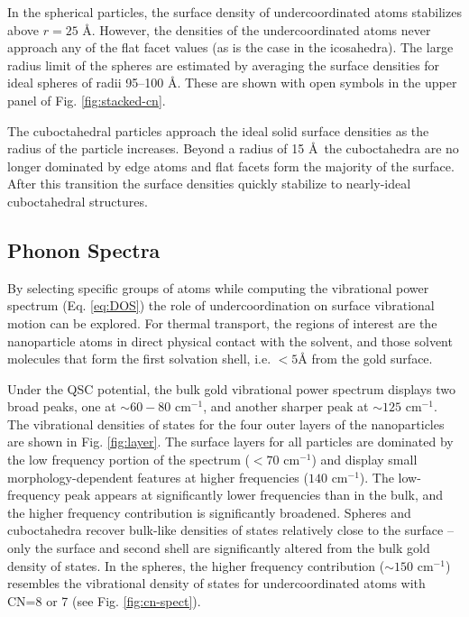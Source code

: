 In the spherical particles, the surface density of undercoordinated
atoms stabilizes above $r = 25$ \AA.  However, the densities of the
undercoordinated atoms never approach any of the flat facet values (as
is the case in the icosahedra).  The large radius
limit of the spheres are estimated by averaging the surface densities for ideal
spheres of radii 95--100 \AA.  These are shown with open symbols in
the upper panel of Fig. \ref{fig:stacked-cn}.

The cuboctahedral particles approach the ideal solid surface densities
as the radius of the particle increases. Beyond a radius of 15 \AA\,
the cuboctahedra are no longer dominated by edge atoms and flat facets
form the majority of the surface. After this transition the surface
densities quickly stabilize to nearly-ideal cuboctahedral structures.

\subsection{Phonon Spectra}
By selecting specific groups of atoms while computing the vibrational
power spectrum (Eq. \ref{eq:DOS}) the role of
undercoordination on surface vibrational motion can be explored. For thermal
transport, the regions of interest are the nanoparticle atoms in
direct physical contact with the solvent, and those solvent molecules
that form the first solvation shell, i.e. $< 5 \text{\AA}$ from the
gold surface.

Under the QSC potential, the bulk gold vibrational power spectrum
displays two broad peaks, one at $\sim 60-80 \text{~cm}^{-1}$, and
another sharper peak at $\sim 125 \text{~cm}^{-1}$.  The vibrational
densities of states for the four outer layers of the nanoparticles are
shown in Fig. \ref{fig:layer}.  The surface layers for all particles
are dominated by the low frequency portion of the spectrum
($<70 \text{~cm}^{-1}$) and display small morphology-dependent
features at higher frequencies ($140 \text{~cm}^{-1}$). The
low-frequency peak appears at significantly lower frequencies than in
the bulk, and the higher frequency contribution is significantly
broadened.  Spheres and cuboctahedra recover bulk-like densities of
states relatively close to the surface -- only the surface and second
shell are significantly altered from the bulk gold density of
states. In the spheres, the higher frequency contribution
($\sim 150 \text{~cm}^{-1}$) resembles the vibrational density of
states for undercoordinated atoms with CN=8 or 7 (see 
Fig. \ref{fig:cn-spect}).

